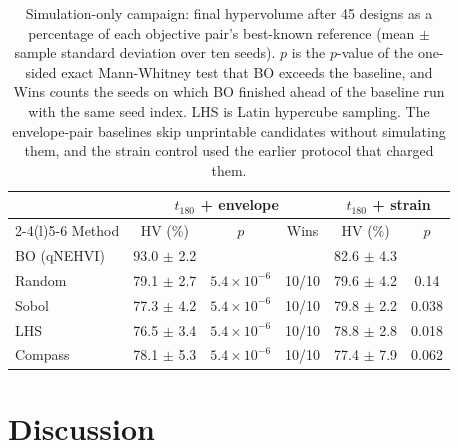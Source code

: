 \documentclass[11pt]{article}
\begin{document}
\begin{table}[!tbp]
  \centering
  \caption{Simulation-only campaign: final hypervolume after 45
    designs as a percentage of each objective pair's best-known
    reference (mean $\pm$ sample standard deviation over ten seeds).
    $p$ is the $p$-value of the one-sided exact Mann-Whitney test that BO exceeds the
    baseline, and Wins counts the seeds on which BO finished ahead of
    the baseline run with the same seed index. LHS is Latin hypercube
    sampling. The envelope-pair baselines skip unprintable candidates
    without simulating them, and the strain control used the earlier
    protocol that charged them.}%
  \label{tab:sim-campaign}
  \footnotesize
  \setlength{\tabcolsep}{3.5pt}
\begin{tabular}{@{}lccccc@{}}
  \toprule
  & \multicolumn{3}{c}{$t_{180}$ + envelope} & \multicolumn{2}{c}{$t_{180}$ + strain} \\
  \cmidrule(lr){2-4}\cmidrule(l){5-6}
  Method & HV (\%) & $p$ & Wins & HV (\%) & $p$ \\
  \midrule
  BO (qNEHVI) & 93.0 $\pm$ 2.2 &  &  & 82.6 $\pm$ 4.3 &  \\
  Random & 79.1 $\pm$ 2.7 & $5.4\times10^{-6}$ & 10/10 & 79.6 $\pm$ 4.2 & 0.14 \\
  Sobol & 77.3 $\pm$ 4.2 & $5.4\times10^{-6}$ & 10/10 & 79.8 $\pm$ 2.2 & 0.038 \\
  LHS & 76.5 $\pm$ 3.4 & $5.4\times10^{-6}$ & 10/10 & 78.8 $\pm$ 2.8 & 0.018 \\
  Compass & 78.1 $\pm$ 5.3 & $5.4\times10^{-6}$ & 10/10 & 77.4 $\pm$ 7.9 & 0.062 \\
  \bottomrule
\end{tabular}
\end{table}

\section{Discussion}
\label{sec:discussion}
\end{document}
